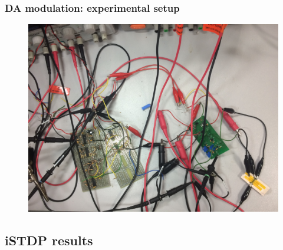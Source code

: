 \documentclass[12pt, aspectratio=169]{beamer}
\begin{document}
\begin{frame}
  \frametitle{DA modulation: experimental setup}
\begin{figure}
\includegraphics[width=0.65\linewidth]{mscs_experimental_setup}
\end{figure}
\end{frame}


\subsection{iSTDP results}
\end{document}
